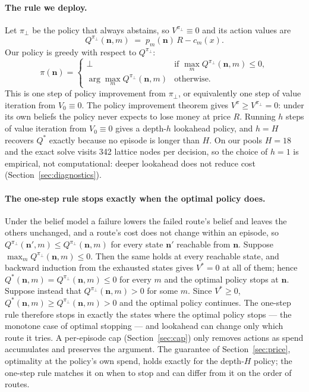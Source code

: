 \documentclass[10pt]{article} %
\newcommand{\abst}{\bot}
\begin{document}
\paragraph{The rule we deploy.}
Let $\pi_\abst$ be the policy that always abstains, so $V^{\pi_\abst}\equiv0$ and its action
values are
\[
Q^{\pi_\abst}(\mathbf n,m)\;=\;p_m(\mathbf n)\,R-c_m(x).
\]
Our policy is greedy with respect to $Q^{\pi_\abst}$:
\[
\pi(\mathbf n)=
\begin{cases}
\abst & \text{if } \max_m Q^{\pi_\abst}(\mathbf n,m)\le 0,\\
\arg\max_m Q^{\pi_\abst}(\mathbf n,m) & \text{otherwise.}
\end{cases}
\]
This is one step of policy improvement from $\pi_\abst$, or equivalently one step of value
iteration from $V_0\equiv0$.  The policy improvement theorem gives $V^\pi\ge V^{\pi_\abst}=0$:
under its own beliefs the policy never expects to lose money at price $R$.  Running $h$ steps of
value iteration from $V_0\equiv0$ gives a depth-$h$ lookahead policy, and $h=H$ recovers $Q^*$
exactly because no episode is longer than $H$.  On our pools $H=18$ and the exact solve visits
342 lattice nodes per decision, so the choice of $h=1$ is empirical, not computational:
deeper lookahead does not reduce cost (Section~\ref{sec:diagnostics}).

\paragraph{The one-step rule stops exactly when the optimal policy does.}
Under the belief model a failure lowers the failed route's belief and leaves the others unchanged,
and a route's cost does not change within an episode, so $Q^{\pi_\abst}(\mathbf n',m)\le
Q^{\pi_\abst}(\mathbf n,m)$ for every state $\mathbf n'$ reachable from $\mathbf n$.  Suppose
$\max_m Q^{\pi_\abst}(\mathbf n,m)\le0$.  Then the same holds at every reachable state, and
backward induction from the exhausted states gives $V^*=0$ at all of them; hence
$Q^*(\mathbf n,m)=Q^{\pi_\abst}(\mathbf n,m)\le0$ for every $m$ and the optimal policy stops at
$\mathbf n$.  Suppose instead that $Q^{\pi_\abst}(\mathbf n,m)>0$ for some $m$.  Since
$V^*\ge0$, $Q^*(\mathbf n,m)\ge Q^{\pi_\abst}(\mathbf n,m)>0$ and the optimal policy continues.
The one-step rule therefore stops in exactly the states where the optimal policy stops --- the
monotone case of optimal stopping \citep{chow1971great} --- and lookahead can change only which
route it tries.  A per-episode cap (Section~\ref{sec:cap}) only removes actions as spend
accumulates and preserves the argument.  The guarantee of Section~\ref{sec:price}, optimality at
the policy's own spend, holds exactly for the depth-$H$ policy; the one-step rule matches it on
when to stop and can differ from it on the order of routes.
\end{document}

